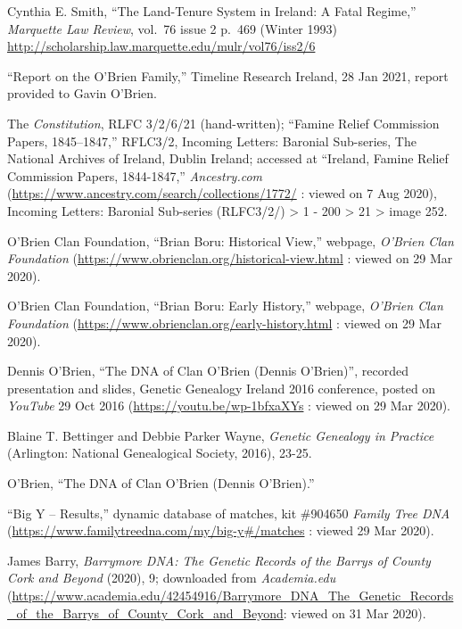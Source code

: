 \begin{thebibliography}{999}
Cynthia E. Smith, ``The Land-Tenure System in Ireland: A Fatal Regime,'' \textit{Marquette Law Review}, vol.\ 76 issue 2 p.\ 469 (Winter 1993) \url{http://scholarship.law.marquette.edu/mulr/vol76/iss2/6}

``Report on the O'Brien Family,'' Timeline Research Ireland, 28 Jan 2021, report provided to Gavin O'Brien.

 The \textit{Constitution}, RLFC 3/2/6/21 (hand-written); ``Famine Relief Commission Papers, 1845–1847,'' RFLC3/2, Incoming Letters: Baronial Sub-series, The National Archives of Ireland, Dublin Ireland;
accessed at ``Ireland, Famine Relief Commission Papers, 1844-1847,'' \textit{Ancestry.com} (\url{https://www.ancestry.com/search/collections/1772/} : viewed on 7 Aug 2020), Incoming Letters: Baronial Sub-series (RLFC3/2/) > 1 - 200 > 21 > image 252.


O'Brien Clan Foundation, ``Brian Boru: Historical View,'' webpage, \textit{O'Brien Clan Foundation} (\url{https://www.obrienclan.org/historical-view.html} : viewed on 29 Mar 2020).

O'Brien Clan Foundation, ``Brian Boru: Early History,'' webpage, \textit{O'Brien Clan Foundation} (\url{https://www.obrienclan.org/early-history.html} : viewed on 29 Mar 2020).

Dennis O'Brien, ``The DNA of Clan O'Brien (Dennis O'Brien)'', recorded presentation and slides, Genetic Genealogy Ireland 2016 conference, posted on \textit{YouTube} 29 Oct 2016 (\url{https://youtu.be/wp-1bfxaXYs} : viewed on 29 Mar 2020).	

Blaine T. Bettinger and Debbie Parker Wayne, \textit{Genetic Genealogy in Practice} (Arlington: National Genealogical Society, 2016), 23-25.

O'Brien, ``The DNA of Clan O'Brien (Dennis O'Brien).''

``Big Y -- Results,'' dynamic database of matches, kit \#904650 \textit{Family Tree DNA} (\url{https://www.familytreedna.com/my/big-y\#/matches} : viewed 29 Mar 2020).

James Barry, \textit{Barrymore DNA: The Genetic Records of the Barrys of County Cork and Beyond} (2020), 9; downloaded from \textit{Academia.edu} (\url{https://www.academia.edu/42454916/Barrymore_DNA_The_Genetic_Records_of_the_Barrys_of_County_Cork_and_Beyond}: viewed on 31 Mar 2020).


\end{thebibliography}
